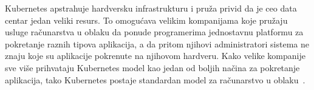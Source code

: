 Kubernetes apstrahuje hardversku infrastrukturu i pruža privid da je ceo data centar jedan veliki resurs. To omogućava
velikim kompanijama koje pružaju usluge računarstva u oblaku da ponude programerima jednostavnu platformu za pokretanje
raznih tipova aplikacija, a da pritom njihovi administratori sistema ne znaju koje su aplikacije pokrenute na njihovom
hardveru. Kako velike kompanije sve više prihvataju Kubernetes model kao jedan od boljih načina za pokretanje aplikacija,
tako Kubernetes postaje standardan model za računarstvo u oblaku~\cite{KIA}.
